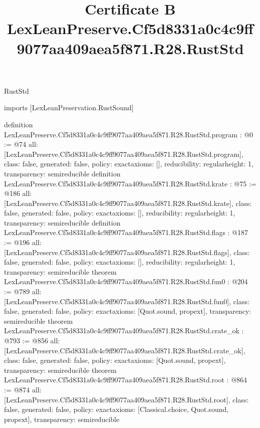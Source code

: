 \begin{lexlean}{RustStd}
\title{Certificate B LexLeanPreserve.Cf5d8331a0c4c9ff9077aa409aea5f871.R28.RustStd}
\begin{coremodule}
imports [LexLeanPreservation.RustSound]

definition LexLeanPreserve.Cf5d8331a0c4c9ff9077aa409aea5f871.R28.RustStd.program : @0 := @74 {
  all: [LexLeanPreserve.Cf5d8331a0c4c9ff9077aa409aea5f871.R28.RustStd.program],
  class: false,
  generated: false,
  policy: exact{axioms: []},
  reducibility: regular{height: 1},
  transparency: semireducible
}
definition LexLeanPreserve.Cf5d8331a0c4c9ff9077aa409aea5f871.R28.RustStd.krate : @75 := @186 {
  all: [LexLeanPreserve.Cf5d8331a0c4c9ff9077aa409aea5f871.R28.RustStd.krate],
  class: false,
  generated: false,
  policy: exact{axioms: []},
  reducibility: regular{height: 1},
  transparency: semireducible
}
definition LexLeanPreserve.Cf5d8331a0c4c9ff9077aa409aea5f871.R28.RustStd.flags : @187 := @196 {
  all: [LexLeanPreserve.Cf5d8331a0c4c9ff9077aa409aea5f871.R28.RustStd.flags],
  class: false,
  generated: false,
  policy: exact{axioms: []},
  reducibility: regular{height: 1},
  transparency: semireducible
}
theorem LexLeanPreserve.Cf5d8331a0c4c9ff9077aa409aea5f871.R28.RustStd.fun0 : @204 := @789 {
  all: [LexLeanPreserve.Cf5d8331a0c4c9ff9077aa409aea5f871.R28.RustStd.fun0],
  class: false,
  generated: false,
  policy: exact{axioms: [Quot.sound, propext]},
  transparency: semireducible
}
theorem LexLeanPreserve.Cf5d8331a0c4c9ff9077aa409aea5f871.R28.RustStd.crate_ok : @793 := @856 {
  all: [LexLeanPreserve.Cf5d8331a0c4c9ff9077aa409aea5f871.R28.RustStd.crate_ok],
  class: false,
  generated: false,
  policy: exact{axioms: [Quot.sound, propext]},
  transparency: semireducible
}
theorem LexLeanPreserve.Cf5d8331a0c4c9ff9077aa409aea5f871.R28.RustStd.root : @864 := @874 {
  all: [LexLeanPreserve.Cf5d8331a0c4c9ff9077aa409aea5f871.R28.RustStd.root],
  class: false,
  generated: false,
  policy: exact{axioms: [Classical.choice, Quot.sound, propext]},
  transparency: semireducible
}


\end{coremodule}
\end{lexlean}
